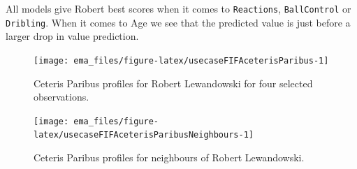 \documentclass[12pt,]{krantz}
\begin{document}
All models give Robert best scores when it comes to \texttt{Reactions}, \texttt{BallControl} or \texttt{Dribling}. When it comes to Age we see that the predicted value is just before a larger drop in value prediction.

\begin{figure}

{\centering \texttt{[image: ema\_files/figure-latex/usecaseFIFAceterisParibus-1]} 

}

\caption{Ceteris Paribus profiles for Robert Lewandowski for four selected observations.}\label{fig:usecaseFIFAceterisParibus}
\end{figure}

\begin{figure}

{\centering \texttt{[image: ema\_files/figure-latex/usecaseFIFAceterisParibusNeighbours-1]} 

}

\caption{Ceteris Paribus profiles for neighbours of Robert Lewandowski.}\label{fig:usecaseFIFAceterisParibusNeighbours}
\end{figure}


\end{document}
